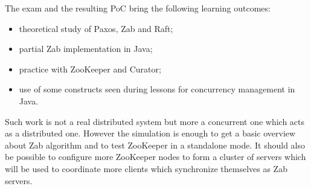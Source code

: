 The exam and the resulting PoC bring the following learning outcomes:
\begin{itemize}
    \item theoretical study of Paxos, Zab and Raft;
    \item partial Zab implementation in Java;
    \item practice with ZooKeeper and Curator;
    \item use of some constructs seen during lessons for concurrency management in Java.
\end{itemize}

Such work is not a real distributed system but more a concurrent one which acts as a distributed one.
However the simulation is enough to get a basic overview about Zab algorithm and to test ZooKeeper in a standalone mode.
It should also be possible to configure more ZooKeeper nodes to form a cluster of servers which will be used to coordinate more clients which synchronize themselves as Zab servers.